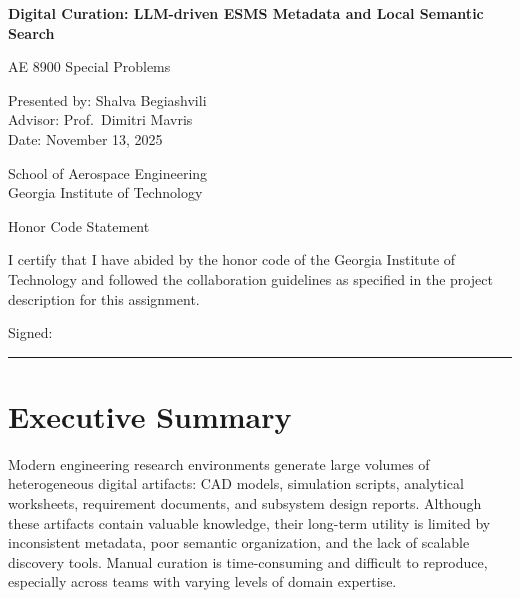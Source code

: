\documentclass[12pt]{article}
\newcommand{\ReportTitle}{Digital Curation: LLM-driven ESMS Metadata and Local Semantic Search}
\newcommand{\CourseCode}{AE 8900 Special Problems}
\newcommand{\StudentName}{Shalva Begiashvili}
\newcommand{\AdvisorName}{Prof.\ Dimitri Mavris}
\newcommand{\ReportDate}{November 13, 2025}
\newcommand{\SchoolName}{School of Aerospace Engineering\\Georgia Institute of Technology}
\begin{document}
\begin{titlepage}
    \centering
    \vspace*{2cm}
    {\LARGE \bfseries \ReportTitle \par}
    \vspace{1.2cm}
    {\Large \CourseCode\par}
    \vspace{2cm}

    \begin{center}
        Presented by: \StudentName\\
        Advisor: \AdvisorName\\
        Date: \ReportDate\\[1.2cm]

    \end{center}

    \vfill

    {\SchoolName\par}
    \vspace{0.8cm}

    {\large Honor Code Statement\par}
    \vspace{0.25cm}
    \small I certify that I have abided by the honor code of the Georgia Institute of Technology and followed the collaboration guidelines as specified in the project description for this assignment.\par
    \vspace{1.2cm}

    Signed:\rule{6cm}{0.4pt}
\end{titlepage}

\setcounter{page}{2}

\section*{Executive Summary}

Modern engineering research environments generate large volumes of heterogeneous digital artifacts: CAD models, simulation scripts, analytical worksheets, requirement documents, and subsystem design reports. Although these artifacts contain valuable knowledge, their long-term utility is limited by inconsistent metadata, poor semantic organization, and the lack of scalable discovery tools. Manual curation is time-consuming and difficult to reproduce, especially across teams with varying levels of domain expertise.
\end{document}
